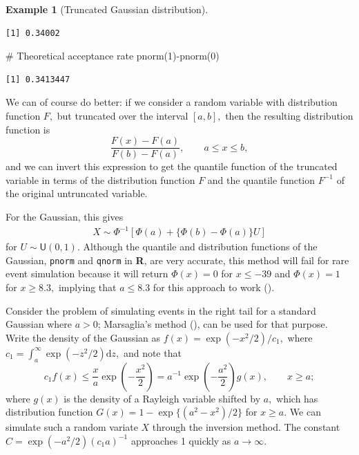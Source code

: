 \documentclass[
  11pt,
  letterpaper,
]{scrbook}
\newenvironment{Shaded}{\begin{snugshade}}{\end{snugshade}}
\newcommand{\CommentTok}[1]{\textcolor[rgb]{0.37,0.37,0.37}{#1}}
\newcommand{\DecValTok}[1]{\textcolor[rgb]{0.68,0.00,0.00}{#1}}
\newcommand{\FunctionTok}[1]{\textcolor[rgb]{0.28,0.35,0.67}{#1}}
\newcommand{\NormalTok}[1]{\textcolor[rgb]{0.00,0.23,0.31}{#1}}
\newcommand{\SpecialCharTok}[1]{\textcolor[rgb]{0.37,0.37,0.37}{#1}}
\theoremstyle{definition}
\theoremstyle{definition}
\newtheorem{example}{Example}[chapter]
\theoremstyle{definition}
\theoremstyle{plain}
\theoremstyle{plain}
\theoremstyle{plain}
\theoremstyle{remark}
\begin{document}
\begin{example}[Truncated Gaussian
distribution]
\begin{verbatim}
[1] 0.34002
\end{verbatim}

\begin{Shaded}
\begin{Highlighting}[]
\CommentTok{\# Theoretical acceptance rate}
\FunctionTok{pnorm}\NormalTok{(}\DecValTok{1}\NormalTok{)}\SpecialCharTok{{-}}\FunctionTok{pnorm}\NormalTok{(}\DecValTok{0}\NormalTok{)}
\end{Highlighting}
\end{Shaded}

\begin{verbatim}
[1] 0.3413447
\end{verbatim}

We can of course do better: if we consider a random variable with
distribution function \(F,\) but truncated over the interval \([a,b],\)
then the resulting distribution function is
\[\frac{F(x) - F(a)}{F(b)-F(a)}, \qquad a \leq x \leq b,\] and we can
invert this expression to get the quantile function of the truncated
variable in terms of the distribution function \(F\) and the quantile
function \(F^{-1}\) of the original untruncated variable.

For the Gaussian, this gives \begin{align*}
X \sim \Phi^{-1}\left[\Phi(a) + \{\Phi(b)-\Phi(a)\}U\right]
\end{align*} for \(U \sim \mathsf{U}(0,1).\) Although the quantile and
distribution functions of the Gaussian, \texttt{pnorm} and
\texttt{qnorm} in \textbf{R}, are very accurate, this method will fail
for rare event simulation because it will return \(\Phi(x) = 0\) for
\(x \leq -39\) and \(\Phi(x)=1\) for \(x \geq 8.3,\) implying that
\(a \leq 8.3\) for this approach to work
().

Consider the problem of simulating events in the right tail for a
standard Gaussian where \(a > 0\); Marsaglia's method
(), can be used for that
purpose. Write the density of the Gaussian as
\(f(x) = \exp(-x^2/2)/c_1,\) where
\(c_1 = \int_{a}^{\infty}\exp(-z^2/2)\mathrm{d} z,\) and note that
\[c_1f(x) \leq \frac{x}{a}\exp\left(-\frac{x^2}{2}\right)= a^{-1}\exp\left(-\frac{a^2}{2}\right)g(x), \qquad x \geq a;\]
where \(g(x)\) is the density of a Rayleigh variable shifted by \(a,\)
which has distribution function \(G(x) = 1-\exp\{(a^2-x^2)/2\}\) for
\(x \geq a.\) We can simulate such a random variate \(X\) through the
inversion method. The constant \(C= \exp(-a^2/2)(c_1a)^{-1}\) approaches
1 quickly as \(a \to \infty.\)


\end{example}
\end{document}
